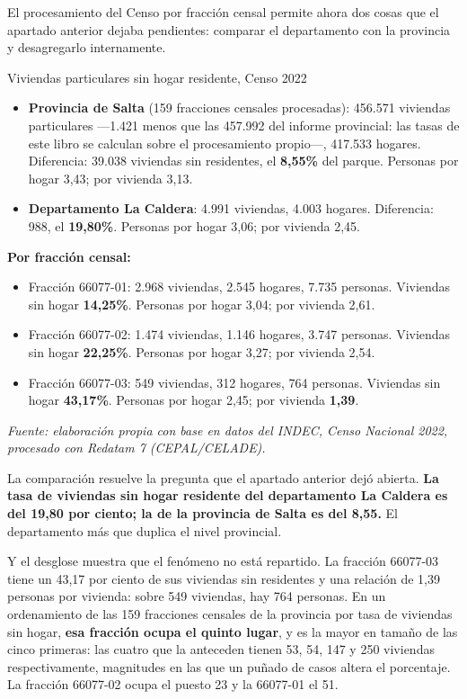 El procesamiento del Censo por fracción censal permite ahora dos cosas que el apartado anterior dejaba pendientes: comparar el departamento con la provincia y desagregarlo internamente.

\begin{ficha}{Viviendas particulares sin hogar residente, Censo 2022}
\begin{itemize}[leftmargin=*,nosep]
\item \textbf{Provincia de Salta} (159 fracciones censales procesadas): 456.571 viviendas particulares ---1.421 menos que las 457.992 del informe provincial: las tasas de este libro se calculan sobre el procesamiento propio---, 417.533 hogares. Diferencia: 39.038 viviendas sin residentes, el \textbf{8,55\%} del parque. Personas por hogar 3,43; por vivienda 3,13.
\item \textbf{Departamento La Caldera}: 4.991 viviendas, 4.003 hogares. Diferencia: 988, el \textbf{19,80\%}. Personas por hogar 3,06; por vivienda 2,45.
\end{itemize}
\textbf{Por fracción censal:}
\begin{itemize}[leftmargin=*,nosep]
\item Fracción 66077-01: 2.968 viviendas, 2.545 hogares, 7.735 personas. Viviendas sin hogar \textbf{14,25\%}. Personas por hogar 3,04; por vivienda 2,61.
\item Fracción 66077-02: 1.474 viviendas, 1.146 hogares, 3.747 personas. Viviendas sin hogar \textbf{22,25\%}. Personas por hogar 3,27; por vivienda 2,54.
\item Fracción 66077-03: 549 viviendas, 312 hogares, 764 personas. Viviendas sin hogar \textbf{43,17\%}. Personas por hogar 2,45; por vivienda \textbf{1,39}.
\end{itemize}
\textit{Fuente: elaboración propia con base en datos del INDEC, Censo Nacional 2022, procesado con Redatam 7 (CEPAL/CELADE).}
\end{ficha}

La comparación resuelve la pregunta que el apartado anterior dejó abierta. \textbf{La tasa de viviendas sin hogar residente del departamento La Caldera es del 19,80 por ciento; la de la provincia de Salta es del 8,55.} El departamento más que duplica el nivel provincial.

Y el desglose muestra que el fenómeno no está repartido. La fracción 66077-03 tiene un 43,17 por ciento de sus viviendas sin residentes y una relación de 1,39 personas por vivienda: sobre 549 viviendas, hay 764 personas. En un ordenamiento de las 159 fracciones censales de la provincia por tasa de viviendas sin hogar, \textbf{esa fracción ocupa el quinto lugar}, y es la mayor en tamaño de las cinco primeras: las cuatro que la anteceden tienen 53, 54, 147 y 250 viviendas respectivamente, magnitudes en las que un puñado de casos altera el porcentaje. La fracción 66077-02 ocupa el puesto 23 y la 66077-01 el 51.

